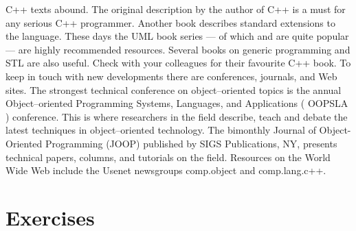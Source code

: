 C++ texts abound. The original description by the author of C++ \cite{Stroustrup84} is a must for any serious C++ programmer. Another book \cite{Ellis90} describes standard extensions to the language.
These days the UML book series --- of which \cite{Booch98} and \cite{Rumbaugh98} are quite popular --- are highly recommended resources. Several books on generic programming \cite{Austern99} and STL \cite{Musser96} are also useful. Check with your colleagues for their favourite C++ book.
To keep in touch with new developments there are conferences, journals, and Web sites. The strongest technical conference on object--oriented topics is the annual Object--oriented Programming Systems, Languages, and Applications ( OOPSLA ) conference. This is where researchers in the field describe, teach and debate the latest techniques in object--oriented technology. The bimonthly Journal of Object-Oriented Programming (JOOP) published by SIGS Publications, NY, presents technical papers, columns, and tutorials on the field. Resources on the World Wide Web include the Usenet newsgroups comp.object and comp.lang.c++.

\printbibliography

\section{Exercises}

